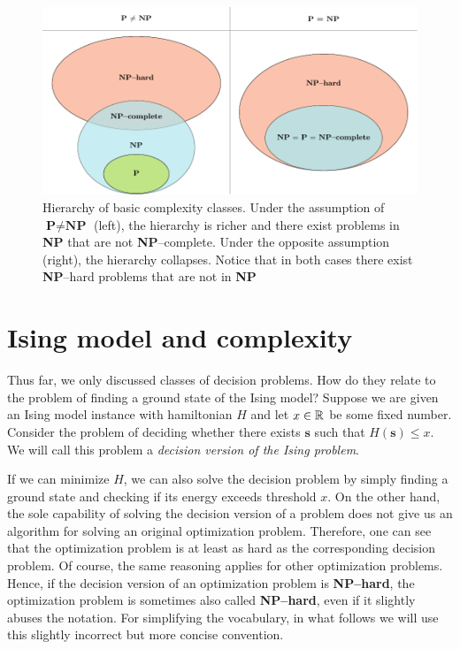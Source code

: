 \begin{figure}
    \includegraphics[width=\textwidth]{figures/complexity_new.pdf}
    \caption{Hierarchy of basic complexity classes. Under the assumption of $\textbf{P} \ne \textbf{NP}$ (left), the hierarchy is richer and there exist problems in \textbf{NP}  that are not \textbf{NP}--complete. Under the opposite assumption (right), the hierarchy collapses. Notice that in both cases there exist \textbf{NP}--hard problems that are not in \textbf{NP}
    }
    \label{fig:complexity}
\end{figure}



\section{Ising model and complexity}

Thus far, we only discussed classes of decision problems. How do they relate to the problem of
finding a ground state of the Ising model? Suppose we are given an Ising model instance with
hamiltonian $H$ and let $x \in \mathbb{R}$ be some fixed number. Consider the problem of deciding whether
there exists $\mathbf{s}$ such that $H(\mathbf{s}) \le x$. We will call this problem a
\emph{decision version of the Ising problem}.

If we can minimize $H$, we can also solve the decision problem by simply finding a ground state and
checking if its energy exceeds threshold $x$. On the other hand, the sole capability of solving the
decision version of a problem does not give us an algorithm for solving an original optimization
problem. Therefore, one can see that the optimization problem is at least as hard as the
corresponding decision problem. Of course, the same reasoning applies for other optimization
problems. Hence, if the decision version of an optimization problem is \textbf{NP--hard},
the optimization problem is sometimes also called \textbf{NP--hard}, even if it slightly abuses the
notation. For simplifying the vocabulary, in what follows we will use this slightly
incorrect but more concise convention.


